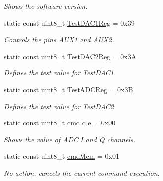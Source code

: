 \begin{DoxyCompactItemize}
\begin{DoxyCompactList}\small\item\em Shows the software version. \end{DoxyCompactList}\item 
\mbox{\label{classMFRC522_a58755b48e8eed115aa5650e8bfb8986f}} 
static const uint8\+\_\+t \hyperlink{classMFRC522_a58755b48e8eed115aa5650e8bfb8986f}{Test\+D\+A\+C1\+Reg} = 0x39
\begin{DoxyCompactList}\small\item\em Controls the pins A\+U\+X1 and A\+U\+X2. \end{DoxyCompactList}\item 
\mbox{\label{classMFRC522_aff5ac0eb39afa116dfd2a8a390b91d25}} 
static const uint8\+\_\+t \hyperlink{classMFRC522_aff5ac0eb39afa116dfd2a8a390b91d25}{Test\+D\+A\+C2\+Reg} = 0x3A
\begin{DoxyCompactList}\small\item\em Defines the test value for Test\+D\+A\+C1. \end{DoxyCompactList}\item 
\mbox{\label{classMFRC522_addbdc1d2d79dc48b5dc8b05757c89d82}} 
static const uint8\+\_\+t \hyperlink{classMFRC522_addbdc1d2d79dc48b5dc8b05757c89d82}{Test\+A\+D\+C\+Reg} = 0x3B
\begin{DoxyCompactList}\small\item\em Defines the test value for Test\+D\+A\+C2. \end{DoxyCompactList}\item 
static const uint8\+\_\+t \hyperlink{classMFRC522_aa0a33c3059b58a75fc8c1ff8201601bb}{cmd\+Idle} = 0x00
\begin{DoxyCompactList}\small\item\em Shows the value of A\+DC I and Q channels. \end{DoxyCompactList}\item 
\mbox{\label{classMFRC522_a3a33c02b0ee2699dc7fd1e0d9522e599}} 
static const uint8\+\_\+t \hyperlink{classMFRC522_a3a33c02b0ee2699dc7fd1e0d9522e599}{cmd\+Mem} = 0x01
\begin{DoxyCompactList}\small\item\em No action, cancels the current command execution. \end{DoxyCompactList}\item 

\end{DoxyCompactItemize}
